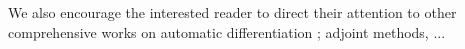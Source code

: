 
We also encourage the interested reader to direct their attention to other comprehensive works on automatic differentiation \cite{Baydin_Pearlmutter_Radul_Siskind_2015}; adjoint methods, ...